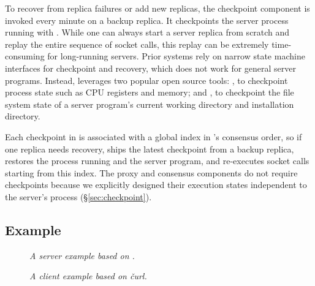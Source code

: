 To recover from replica failures or add new replicas, the checkpoint 
component is invoked every minute on a backup replica. It
checkpoints the server process running with \dmt.  While one can always start a 
server replica from scratch and replay the entire sequence of socket calls, 
this replay can be extremely time-consuming for long-running servers.  Prior 
\smr systems rely on narrow state machine interfaces for checkpoint and
recovery, which does not work for general server programs. Instead, \xxx
leverages two popular open source tools: \criu, to checkpoint process 
state such as CPU registers and memory; and \lxc, to checkpoint the file 
system state of a server program's current working directory and installation 
directory.

Each checkpoint in \xxx is associated with a global index in \paxos's consensus 
order, so if one replica needs recovery, \xxx ships the latest checkpoint from a 
backup replica, restores the process running \dmt and the server program, and 
re-executes socket calls starting from this index. The proxy and consensus 
components do not require checkpoints because we explicitly designed their 
execution states independent to the server's process (\S\ref{sec:checkpoint}).



\subsection{Example} \label{sec:example}

\begin{figure}[t]
\centering
\begin{minipage}{.5\textwidth}
\end{minipage}
\vspace{-.1in}
\caption{{\em A server example based on \apache.}} \label{fig:example}
\vspace{-.20in}
\end{figure}

\begin{figure}[t]
\centering
\begin{minipage}{.5\textwidth}
\end{minipage}
\vspace{-.1in}
\caption{{\em A client example based on \v{curl}.}} \label{fig:client}
\vspace{-.05in}
\end{figure}

